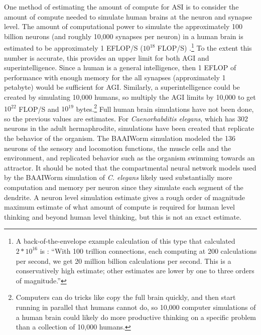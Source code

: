 \documentclass[letterpaper,twocolumn]{article}
\begin{document}
One method of estimating the amount of compute for ASI is to consider
the amount of compute needed to simulate human brains at the neuron
and synapse level. The amount of computational power to simulate the
approximately 100 billion neurons (and roughly 10,000 synapses per
neuron) in a human brain is estimated to be approximately 1 EFLOP/S
($10^{18}$ FLOP/S) \citep{hpcbrainscience}.\footnote{A
back-of-the-envelope example calculation of this type that calculated
$2 * 10^{16}$ is \cite[pg 103]{kurzweil1999}: ``With 100 trillion
connections, each computing at 200 calculations per second, we get 20
million billion calculations per second. This is a conservatively high
estimate; other estimates are lower by one to three orders of
magnitude.''}  To the extent this number is accurate, this provides an
upper limit for both AGI and superintelligence.  Since a human is a
general intelligence, then 1 EFLOP of performance with enough memory
for the all synapses (approximately 1 petabyte) would be sufficient
for AGI. Similarly, a superintelligence could be created by simulating
10,000 humans, so multiply the AGI limits by 10,000 to get $10^{22}$
FLOP/S and $10^{19}$ bytes.\footnote{Computers can do tricks like copy
the full brain quickly, and then start running in parallel that humans
cannot do, so 10,000 computer simulations of a human brain could
likely do more productive thinking on a specific problem than a
collection of 10,000 humans.} Full human brain simulations have not
been done, so the previous values are estimates.  For {\em
  Caenorhabditis elegans}, which has 302 neurons in the adult
hermaphrodite, simulations have been created that replicate the
behavior of the organism. The BAAIWorm simulation modeled the 136
neurons of the sensory and locomotion functions, the muscle cells and
the environment, and replicated behavior such as the organism swimming
towards an attractor. It should be noted that the compartmental neural
network models used by the BAAIWorm simulation of {\em C.  elegans}
\citep{celeganssimulationzhao2024} likely used substantially more
computation and memory per neuron since they simulate each segment of
the dendrite. A neuron level simulation estimate gives a rough order
of magnitude maximum estimate of what amount of compute is required
for human level thinking and beyond human level thinking, but this is
not an exact estimate.
\end{document}
